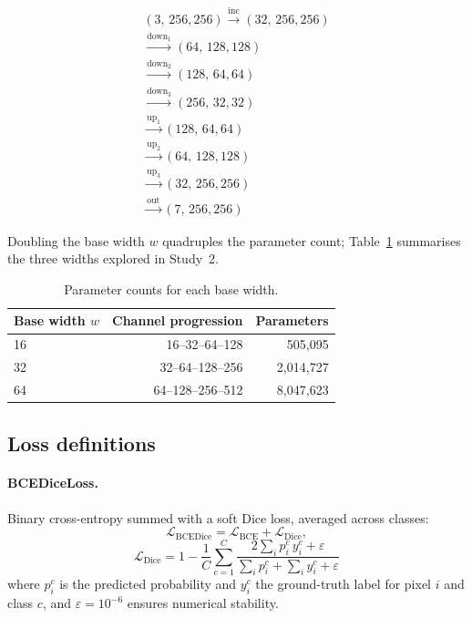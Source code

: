 \documentclass{aa}
\begin{document}
\begin{appendix}
\[
\begin{array}{c}
(3,\,256,256)
\xrightarrow{\text{inc}}   (32,\,256,256)\\[2pt]
\xrightarrow{\text{down}_1}(64,\,128,128)\\[2pt]
\xrightarrow{\text{down}_2}(128,\,64,64)\\[2pt]
\xrightarrow{\text{down}_3}(256,\,32,32)\\[4pt]
\xrightarrow{\text{up}_1}  (128,\,64,64)\\[2pt]
\xrightarrow{\text{up}_2}  (64,\,128,128)\\[2pt]
\xrightarrow{\text{up}_3}  (32,\,256,256)\\[2pt]
\xrightarrow{\text{out}}   (7,\,256,256)
\end{array}
\]

\noindent
Doubling the base width $w$ quadruples the parameter count; Table~\ref{tab:bw_params} summarises the three widths explored in Study~2.

\begin{table}[htbp]
\centering
\caption{Parameter counts for each base width.}
\label{tab:bw_params}
\begin{tabular}{lrr}
\toprule
Base width $w$ & Channel progression & Parameters \\
\midrule
16 & 16--32--64--128  &    505{,}095 \\
32 & 32--64--128--256 & 2{,}014{,}727 \\
64 & 64--128--256--512 & 8{,}047{,}623 \\
\bottomrule
\end{tabular}
\end{table}

\subsection{Loss definitions}

\paragraph{BCEDiceLoss.}
Binary cross-entropy summed with a soft Dice loss, averaged across classes:
\[
\mathcal{L}_{\text{BCEDice}} = \mathcal{L}_{\text{BCE}} + \mathcal{L}_{\text{Dice}},
\]
\[
\mathcal{L}_{\text{Dice}} = 1 - \frac{1}{C}\sum_{c=1}^{C} \frac{2\sum_i p_i^c\, y_i^c + \varepsilon}{\sum_i p_i^c + \sum_i y_i^c + \varepsilon}
\]
where $p_i^c$ is the predicted probability and $y_i^c$ the ground-truth label for pixel $i$ and class $c$, and $\varepsilon=10^{-6}$ ensures numerical stability.


\end{appendix}
\end{document}

